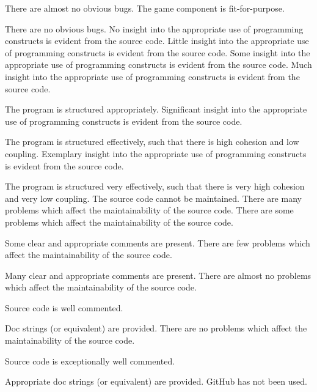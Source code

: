 \documentclass{../fal_assignment}
\begin{document}
\begin{markingrubric}
        \par 		There are almost no obvious bugs.
        \grade 		The game component is fit-for-purpose.
        \par 		There are no obvious bugs.
%
        \grade\fail 	No insight into the appropriate use of programming constructs is evident from the source code.
        \grade 		Little insight into the appropriate use of programming constructs is evident from the source code.
        \grade 		Some insight into the appropriate use of programming constructs is evident from the source code.
        \grade 		Much insight into the appropriate use of programming constructs is evident from the source code.
        \par 		The program is structured appropriately.
        \grade 		Significant insight into the appropriate use of programming constructs is evident from the source code.
        \par 		The program is structured effectively, such that there is high cohesion and low coupling.
        \grade 		Exemplary insight into the appropriate use of programming constructs is evident from the source code.
        \par 		The program is structured very effectively, such that there is very high cohesion and very low coupling.
%
        \grade\fail 	The source code cannot be maintained.
        \grade 		There are many problems which affect the maintainability of the source code.
        \grade 		There are some problems which affect the maintainability of the source code. 
        \par 		Some clear and appropriate comments are present.
        \grade 		There are few problems which affect the maintainability of the source code. 
        \par 		Many clear and appropriate comments are present.
        \grade 		There are almost no problems which affect the maintainability of the source code. 
        \par 		Source code is well commented.
        \par 		Doc strings (or equivalent) are provided.       
        \grade 		There are no problems which affect the maintainability of the source code.
        \par 		Source code is exceptionally well commented.
        \par 		Appropriate doc strings (or equivalent) are provided. 
%
        \grade\fail 	GitHub has not been used.

\end{markingrubric}
\end{document}
